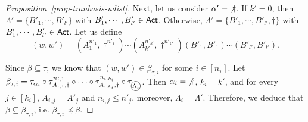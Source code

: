 \begin{proof}[Proposition~\ref{prop-tranbasis-udist}]
Next, let us consider $\alpha' = {\not \dag}$. If $k' = 0$, then $\Lambda' = \{B'_1, \cdots, B'_{l'}\}$ with $B'_{1}, \cdots, B'_{ l'} \in {\sf Act}$. Otherwise,  $\Lambda' = \{ B'_{1}, \cdots, B'_{l'}, \dag\}$ with $B'_{1}, \cdots, B'_{ l'} \in {\sf Act}$.
Let us define 
$$(w, w') = (A^{n'_{1}}_{1}, \dag^{n'_{1}}) \cdots (A^{n'_{k'}}_{k'}, \dag^{n'_{ k'}}) (B'_{1}, B'_{1}) \cdots (B'_{ l'}, B'_{ l'}).$$

Since $\beta \subseteq \tau$, we know that $(w, w') \in \beta_{\tau, i}$ for some $i \in [n_\tau]$. 
Let $ \beta_{\tau, i} = \tau_{\alpha_i} \circ \tau^{n_{i,1}}_{A_{i,1}, \dag} \circ \cdots \circ  \tau^{n_{i, k_i}}_{A_{i,k_i}, \dag} \circ \tau_{\mathcircled{\Lambda_i}}$.
%
Then $\alpha_i = {\not \dag}$, $k_i = k'$, and for every $j \in [k_i]$, $A_{i, j} = A'_{j}$ and $n_{i, j} \le n'_{ j}$, moreover, $\Lambda_i = \Lambda'$.
Therefore, we deduce that $\beta \subseteq \beta_{\tau, i}$, i.e. $\beta_{\tau, i} \preceq \beta$.
\end{proof}

